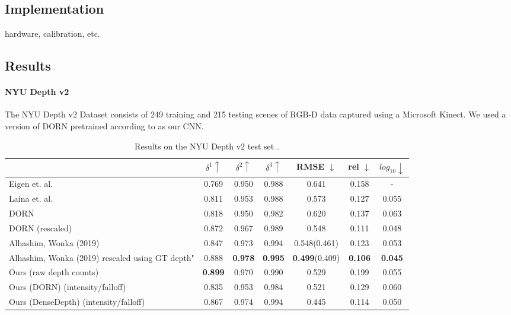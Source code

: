 \subsection{Implementation} 

hardware, calibration, etc.

\subsection{Results} 
\paragraph{NYU Depth v2}
The NYU Depth v2 Dataset consists of 249 training and 215 testing scenes of
RGB-D data captured using a Microsoft Kinect. We used a version of DORN
pretrained according to \cite{Fu. et al} as our CNN.
\newpage
\begin{table*}
\begin{center}
\begin{tabular}{lccc|ccc}
  \toprule
    & $\delta^1 \uparrow$ & $\delta^2\uparrow$ & $\delta^3 \uparrow$ & RMSE $\downarrow$ & rel $\downarrow$ & $log_{10} \downarrow$ \\
  \midrule
Eigen et. al. & 0.769 & 0.950 & 0.988 & 0.641 & 0.158 & - \\ 
Laina et. al.&0.811&0.953&0.988&0.573&0.127&0.055 \\
DORN&0.818&0.950&0.982&0.620&0.137&0.063 \\
  DORN (rescaled) & 0.872 & 0.967 & 0.989 & 0.548 & 0.111 & 0.048 \\
Alhashim, Wonka (2019)&0.847&0.973&0.994&0.548(0.461)&0.123&0.053 \\
Alhashim, Wonka (2019) rescaled using GT depth"&0.888&\textbf{0.978}&\textbf{0.995}&\textbf{0.499}(0.409)&\textbf{0.106}&\textbf{0.045} \\
  \midrule
  Ours (raw depth counts) & \textbf{0.899} & 0.970 & 0.990 & 0.529 & 0.199 & 0.055 \\
  Ours (DORN) (intensity/falloff) & 0.835 & 0.953 & 0.984 & 0.521 & 0.129 & 0.060 \\
  Ours (DenseDepth) (intensity/falloff) & 0.867 & 0.974 & 0.994 & 0.445 & 0.114 & 0.050 \\
  \bottomrule
\end{tabular} 
\end{center}
\caption{Results on the NYU Depth v2 test set \cite{nyudepth}.}
\end{table*}

